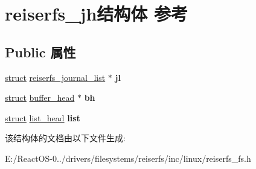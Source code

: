 \hypertarget{structreiserfs__jh}{}\section{reiserfs\+\_\+jh结构体 参考}
\label{structreiserfs__jh}
\subsection*{Public 属性}
\begin{DoxyCompactItemize}
\item 
\mbox{\label{structreiserfs__jh_ad742dbef5868ec22ba791f7e526c80b4}} 
\hyperlink{interfacestruct}{struct} \hyperlink{structreiserfs__journal__list}{reiserfs\+\_\+journal\+\_\+list} $\ast$ {\bfseries jl}
\item 
\mbox{\label{structreiserfs__jh_ae498b78e4b7e30894ab2ce207b44a781}} 
\hyperlink{interfacestruct}{struct} \hyperlink{structbuffer__head}{buffer\+\_\+head} $\ast$ {\bfseries bh}
\item 
\mbox{\label{structreiserfs__jh_a6fc64a2752fc22ea10d82a4d6e125403}} 
\hyperlink{interfacestruct}{struct} \hyperlink{structlist__head}{list\+\_\+head} {\bfseries list}
\end{DoxyCompactItemize}


该结构体的文档由以下文件生成\+:\begin{DoxyCompactItemize}
\item 
E\+:/\+React\+O\+S-\/0../drivers/filesystems/reiserfs/inc/linux/reiserfs\+\_\+fs.\+h\end{DoxyCompactItemize}
